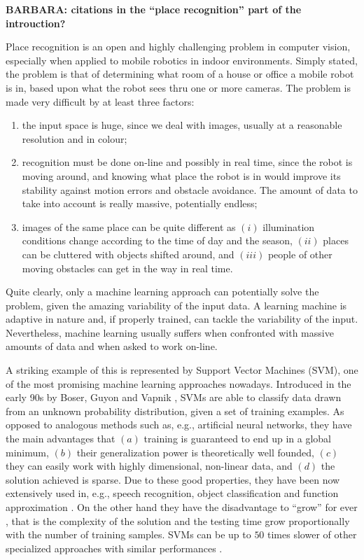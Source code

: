 \textbf{BARBARA: citations in the ``place recognition'' part of the introuction?}

Place recognition is an open and highly challenging problem in
computer vision, especially when applied to mobile robotics in indoor
environments. Simply stated, the problem is that of determining what
room of a house or office a mobile robot is in, based upon what the
robot sees thru one or more cameras. The problem is made very
difficult by at least three factors:

\begin{enumerate}

  \item the input space is huge, since we deal with images, usually at
    a reasonable resolution and in colour;

  \item recognition must be done on-line and possibly in real time,
    since the robot is moving around, and knowing what place the robot
    is in would improve its stability against motion errors and
    obstacle avoidance. The amount of data to take into account is
    really massive, potentially endless;

  \item images of the same place can be quite different as $(i)$
    illumination conditions change according to the time of day and
    the season, $(ii)$ places can be cluttered with objects shifted
    around, and $(iii)$ people of other moving obstacles can get in
    the way in real time.

\end{enumerate}

Quite clearly, only a machine learning approach can potentially solve
the problem, given the amazing variability of the input data. A
learning machine is adaptive in nature and, if properly trained, can
tackle the variability of the input. Nevertheless, machine learning
usually suffers when confronted with massive amounts of data and when
asked to work on-line.

A striking example of this is represented by Support Vector Machines
(SVM), one of the most promising machine learning approaches
nowadays. Introduced in the early 90s by Boser, Guyon and Vapnik
\cite{BGV92}, SVMs are able to classify data drawn from an unknown
probability distribution, given a set of training examples. As opposed
to analogous methods such as, e.g., artificial neural networks, they
have the main advantages that $(a)$ training is guaranteed to end up
in a global minimum, $(b)$ their generalization power is theoretically
well founded, $(c)$ they can easily work with highly dimensional,
non-linear data, and $(d)$ the solution achieved is sparse. Due to
these good properties, they have been now extensively used in, e.g.,
speech recognition, object classification and function approximation
\cite{Cristianini00}. On the other hand they have the disadvantage to
``grow'' for ever \cite{Steinwart03}, that is the complexity of the
solution and the testing time grow proportionally with the number of
training samples. SVMs can be up to $50$ times slower of other
specialized approaches with similar performances
\cite{BurgesS96}.

